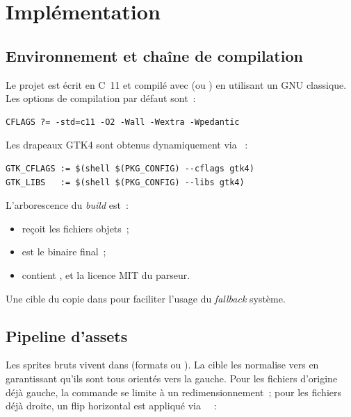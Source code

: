 \chapter{Implémentation}
\label{chap:implementation}

\section{Environnement et chaîne de compilation}

Le projet est écrit en C~11 et compilé avec  (ou
) en utilisant un  GNU classique. Les
options de compilation par défaut sont~:

\begin{verbatim}
CFLAGS ?= -std=c11 -O2 -Wall -Wextra -Wpedantic
\end{verbatim}

Les drapeaux GTK4 sont obtenus dynamiquement via ~:

\begin{verbatim}
GTK_CFLAGS := $(shell $(PKG_CONFIG) --cflags gtk4)
GTK_LIBS   := $(shell $(PKG_CONFIG) --libs gtk4)
\end{verbatim}

L'arborescence du \emph{build} est~:

\begin{itemize}
  \item {} reçoit les fichiers objets~;
  \item {} est le binaire final~;
  \item {} contient , 
    et la licence MIT du parseur.
\end{itemize}

Une cible  du  copie
 dans 
pour faciliter l'usage du \emph{fallback} système.

\section{Pipeline d'assets}

Les sprites bruts vivent dans  (formats 
ou ). La cible  les normalise vers
 en garantissant qu'ils sont tous orientés vers la
gauche. Pour les fichiers d'origine déjà gauche, la commande se
limite à un redimensionnement~; pour les fichiers déjà droite, un
flip horizontal est appliqué via ~\cite{ffmpeg}~:

